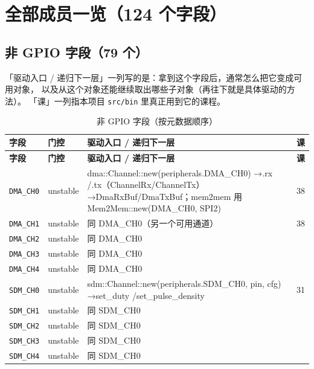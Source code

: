\documentclass[UTF8,a4paper,11pt,fontset=fandol]{ctexart}
\newcommand{\fld}[1]{\texttt{#1}}
\newcommand{\tblhead}[1]{\textbf{#1}}
\begin{document}
\newpage
\section{全部成员一览（124 个字段）}

\subsection{非 GPIO 字段（79 个）}

「驱动入口 / 递归下一层」一列写的是：拿到这个字段后，通常怎么把它变成可用对象，
以及从这个对象还能继续取出哪些子对象（再往下就是具体驱动的方法）。
「课」一列指本项目 \fld{src/bin} 里真正用到它的课程。

\begin{center}\footnotesize
\begin{longtable}{@{}p{2.15cm}p{1.0cm}>{\raggedright\arraybackslash}p{9.4cm}p{1.65cm}@{}}
\caption{非 GPIO 字段（按元数据顺序）}\label{tab:main}\\
\toprule
\tblhead{字段} & \tblhead{门控} & \tblhead{驱动入口 / 递归下一层} & \tblhead{课} \\
\midrule
\endfirsthead
\toprule
\tblhead{字段} & \tblhead{门控} & \tblhead{驱动入口 / 递归下一层} & \tblhead{课} \\
\midrule
\endhead
\bottomrule
\endlastfoot
\fld{DMA\_CH0} & unstable & dma::\allowbreak Channel::\allowbreak new(peripherals.DMA\_CH0) →\allowbreak  .rx /\allowbreak  .tx（ChannelRx/\allowbreak ChannelTx）→\allowbreak  DmaRxBuf/\allowbreak DmaTxBuf；mem2mem 用 Mem2Mem::\allowbreak new(DMA\_CH0, SPI2) & 38 \\
\fld{DMA\_CH1} & unstable & 同 DMA\_CH0（另一个可用通道） & 38 \\
\fld{DMA\_CH2} & unstable & 同 DMA\_CH0 &  \\
\fld{DMA\_CH3} & unstable & 同 DMA\_CH0 &  \\
\fld{DMA\_CH4} & unstable & 同 DMA\_CH0 &  \\
\fld{SDM\_CH0} & unstable & sdm::\allowbreak Channel::\allowbreak new(peripherals.SDM\_CH0, pin, cfg) →\allowbreak  set\_duty /\allowbreak  set\_pulse\_density & 31 \\
\fld{SDM\_CH1} & unstable & 同 SDM\_CH0 &  \\
\fld{SDM\_CH2} & unstable & 同 SDM\_CH0 &  \\
\fld{SDM\_CH3} & unstable & 同 SDM\_CH0 &  \\
\fld{SDM\_CH4} & unstable & 同 SDM\_CH0 &  \\

\end{longtable}
\end{center}
\end{document}
